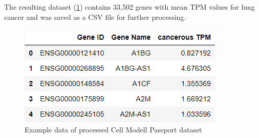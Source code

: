The resulting dataset (\cref{fig:03_01_df_CMP_cancer_mean}) contains 33,502 genes with mean TPM values for lung cancer and was saved as a CSV file for further processing.

\begin{figure}[h]
    \centering
    \includegraphics[height=\dfheight]{figures/03_01_CMP_cancer_mean}
    \caption{Example data of processed Cell Modell Passport dataset}
    \label{fig:03_01_df_CMP_cancer_mean}
\end{figure}

